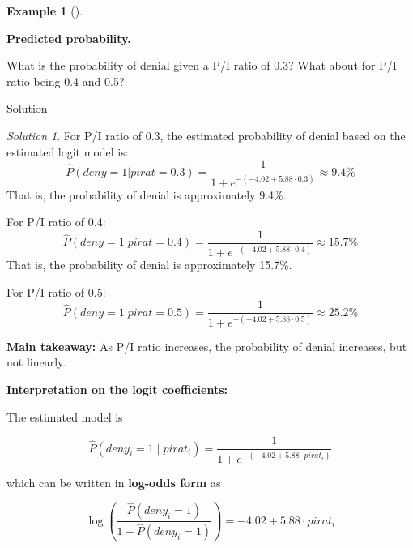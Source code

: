 \documentclass[
  12pt,
  a4paper,
]{scrbook}
\theoremstyle{plain}
\theoremstyle{definition}
\newtheorem{example}{Example}[chapter]
\theoremstyle{remark}
\newtheorem{refsolution}{Solution}[chapter]
\begin{document}
\begin{example}[]\protect\hypertarget{exm-1}{}\label{exm-1}

\textbf{Predicted probability.}

What is the probability of denial given a P/I ratio of 0.3? What about
for P/I ratio being 0.4 and 0.5?

\end{example}

Solution

\begin{refsolution}
For P/I ratio of 0.3, the estimated probability of denial based on the
estimated logit model is: \[
\widehat{P}(deny = 1 | pirat = 0.3) = \frac{1}{1 + e^{-(-4.02 + 5.88 \cdot 0.3)}} \approx 9.4\%
\] That is, the probability of denial is approximately 9.4\%.

For P/I ratio of 0.4: \[
\widehat{P}(deny = 1 | pirat = 0.4) = \frac{1}{1 + e^{-(-4.02 + 5.88 \cdot 0.4)}} \approx 15.7\%
\] That is, the probability of denial is approximately 15.7\%.

For P/I ratio of 0.5: \[
\widehat{P}(deny = 1 | pirat = 0.5) = \frac{1}{1 + e^{-(-4.02 + 5.88 \cdot 0.5)}} \approx 25.2\%
\]

\textbf{Main takeaway:} As P/I ratio increases, the probability of
denial increases, but not linearly.

\label{sol-1}

\end{refsolution}

{\textbf{Interpretation on the logit coefficients:}}

The estimated model is

\[
\widehat{P}(deny_i = 1 \mid pirat_i) = \frac{1}{1 + e^{-(-4.02 + 5.88 \cdot pirat_i)}}
\]

which can be written in \textbf{log-odds form} as

\[
\log\left(\frac{\widehat{P}(deny_i = 1)}{1 - \widehat{P}(deny_i = 1)}\right) = -4.02 + 5.88 \cdot pirat_i
\]
\end{document}

